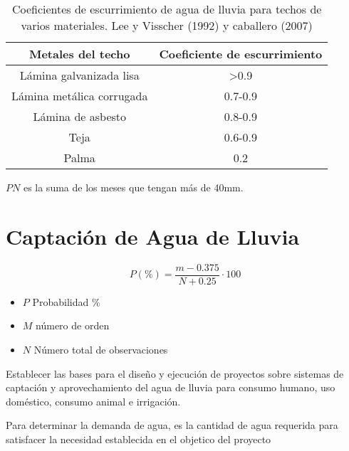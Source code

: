 \begin{table}[h!]
    \centering
    \begin{tabular}{@{}cc@{}}
    \toprule
    Metales del techo         & Coeficiente de escurrimiento \\ \midrule
    Lámina galvanizada lisa   & \textgreater{}0.9            \\
    Lámina metálica corrugada & 0.7-0.9                      \\
    Lámina de asbesto         & 0.8-0.9                      \\
    Teja                      & 0.6-0.9                      \\
    Palma                     & 0.2                          \\ \bottomrule
    \end{tabular}
    \caption{Coeficientes de escurrimiento de agua de lluvia para techos de varios materiales. Lee y Visscher (1992) y caballero (2007)}
    \label{tabtusa2}
\end{table}

$PN$ es la suma de los meses que tengan más de 40mm.



\section{Captación de Agua de Lluvia}
\begin{equation}
    P(\%) = \frac{m - 0.375}{N + 0.25} \cdot 100 
\end{equation}
\begin{notation}
\begin{itemize}
    \item $P$ Probabilidad \%
    \item $M$ número de orden
    \item $N$ Número total de observaciones
\end{itemize}
\end{notation}
Establecer las bases para el diseño y ejecución de proyectos sobre sistemas de captación y aprovechamiento del agua de lluvia para consumo humano, uso doméstico, consumo animal e irrigación.

Para determinar la demanda de agua, es la cantidad de agua requerida para satisfacer la necesidad establecida en el objetico del proyecto

